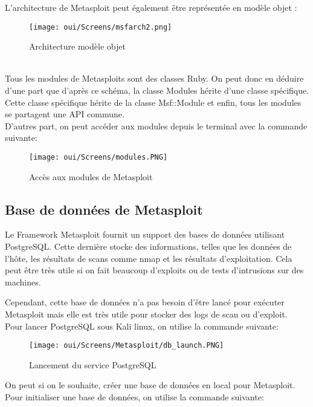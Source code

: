 \noindent L’architecture de Metasploit peut également être représentée en modèle objet : 
\begin{figure}[htp!]
  \centering
  \setlength\figureheight{7cm}
  \setlength\figurewidth{9cm}
  \texttt{[image: oui/Screens/msfarch2.png]}
  \caption{Architecture modèle objet}
  \label{fig:courbe-tikz}
\end{figure}\\
Tous les modules de Metasploits sont des classes Ruby. On peut donc en déduire d'une part que d'après ce schéma, la classe Modules hérite d'une classe spécifique. Cette classe spécifique hérite de la classe Msf::Module et enfin, tous les modules se partagent une API commune.\\

D'autres part, on peut accéder aux modules depuis le terminal avec la commande suivante:
\begin{figure}[htp!]
  \centering
  \setlength\figureheight{7cm}
  \setlength\figurewidth{9cm}
  \texttt{[image: oui/Screens/modules.PNG]}
  \caption{Accès aux modules de Metasploit}
  \label{fig:courbe-tikz}
\end{figure}

\subsection{Base de données de Metasploit}
\noindent Le Framework Metasploit fournit un support des bases de données utilisant  PostgreSQL. Cette dernière stocke des informations, telles que les données de l'hôte, les résultats de scans comme nmap et les résultats d'exploitation. Cela peut être très utile si on fait beaucoup d'exploits ou de tests d'intrusions sur des machines.

\noindent Cependant, cette base de données n'a pas besoin d'être lancé pour exécuter Metasploit mais elle est très utile pour stocker des logs de scan ou d'exploit.\\

\noindent Pour lancer PostgreSQL sous Kali linux, on utilise la commande suivante:
\begin{figure}[htp!]
  \centering
  \setlength\figureheight{7cm}
  \setlength\figurewidth{9cm}
  \texttt{[image: oui/Screens/Metasploit/db\_launch.PNG]}
  \caption{Lancement du service PostgreSQL}
  \label{fig:courbe-tikz}
\end{figure}

\noindent On peut si on le souhaite, créer une base de données en local pour Metasploit. Pour initialiser une base de données, on utilise la commande suivante:

